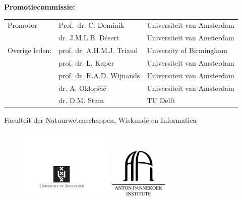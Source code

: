 \clearpage



{\bf\normalsize Promotiecommissie:} \\[0.2cm]

\begin{tabular}{@{}lll}
     Promotor:      & Prof.~dr. C. Dominik & Universiteit van Amsterdam\\
					&	dr. J.M.L.B. D\'{e}sert &	Universiteit van Amsterdam\\
	Overige leden:	& prof. dr. A.H.M.J. Triaud & University of Birmingham\\
                    & prof. dr. L. Kaper & Universiteit van Amsterdam\\
                    & prof. dr. R.A.D. Wijnands & Universiteit van Amsterdam\\
                    & dr. A. Oklop\u{c}i\'{c} & Universiteit van Amsterdam\\
                    & dr. D.M. Stam & TU Delft

\end{tabular}

\vspace*{0.2cm}
Faculteit der Natuurwetenschappen, Wiskunde en Informatica

\vspace*{\fill}

\begin{figure}[!h]
\includegraphics[width=0.4\textwidth]{gfx/titlepage/UvA_logo.pdf}
\hspace{4cm}
\includegraphics[width=0.25\textwidth]{gfx/titlepage/API_logo.pdf}
\end{figure}

